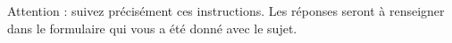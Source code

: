 Attention : suivez précisément ces instructions. Les réponses seront à renseigner dans le formulaire qui vous a été donné avec le sujet.
